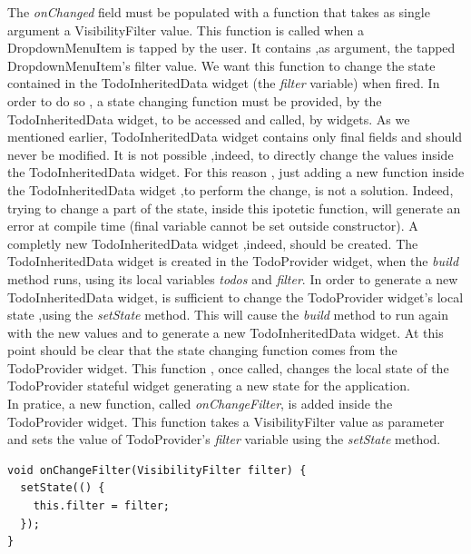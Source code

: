 The \textit{onChanged  }field must be populated with a function that takes as single argument a VisibilityFilter value. This function is called when a DropdownMenuItem is tapped by the user. It contains ,as argument, the tapped DropdownMenuItem's filter value.  We want this function to change the state contained in the TodoInheritedData widget (the \textit{filter} variable) when fired. In order to do so , a state changing function must be provided, by the TodoInheritedData widget, to be accessed and called, by widgets. As we mentioned earlier, TodoInheritedData widget contains only final fields and should never be modified. It is not possible ,indeed, to directly change the values inside the TodoInheritedData widget. For this reason , just adding a new function inside the TodoInheritedData widget ,to perform the change, is not a solution. Indeed, trying to change a part of the state, inside this ipotetic function, will generate an error at compile time (final variable cannot be set outside constructor). A completly new TodoInheritedData widget ,indeed, should be created. The TodoInheritedData widget is created in the TodoProvider widget, when the \textit{build} method runs, using its local variables \textit{todos }and \textit{filter}. In order to generate a new TodoInheritedData widget, is sufficient to change the TodoProvider widget's local state ,using the \textit{setState} method. This will cause the \textit{build} method to run again with the new values and to generate a new TodoInheritedData widget. At this point should be clear that the state changing function comes from the TodoProvider widget. This function , once called, changes the local state of the TodoProvider stateful widget generating a new state for the application.\\
In pratice, a new function, called \textit{onChangeFilter}, is added inside the TodoProvider widget. This function takes a VisibilityFilter value as parameter and sets the  value of TodoProvider's \textit{filter} variable using the \textit{setState} method. 
\mbox{}\\
\begin{code}
 \mbox{}

\label{code:2.24}
\begin{verbatim}
void onChangeFilter(VisibilityFilter filter) {
  setState(() {
    this.filter = filter;
  });
}
\end{verbatim}
\end{code}
